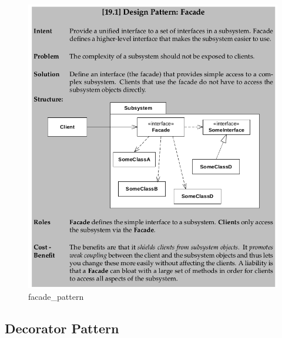 \documentclass[11pt]{article}
\makeatletter
\def\maxwidth{\ifdim\Gin@nat@width>\linewidth\linewidth
    \else\Gin@nat@width\fi}
\let\Oldincludegraphics\includegraphics
\renewcommand{\includegraphics}[1]{\Oldincludegraphics[width=.8\maxwidth]{#1}}
\makeatother
\begin{document}
\begin{figure}
\centering
\includegraphics{img/facade_pattern.png}
\caption{facade\_pattern}
\end{figure}

\hypertarget{decorator-pattern}{%
\subsection{Decorator Pattern}\label{decorator-pattern}}
\end{document}
